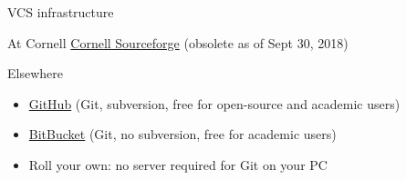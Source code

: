 \documentclass[xcolor=table,compress]{beamer}
\begin{document}
%
%
%


\begin{frame}{VCS infrastructure}
\begin{block}{At Cornell}
\href{https://forge.cornell.edu/sf/sfmain/do/home}{Cornell Sourceforge} (obsolete as of Sept 30, 2018)
\end{block}
\begin{block}{Elsewhere}
\begin{itemize}
\item \href{https://github.com/plans}{GitHub} (Git, subversion, free for open-source and academic users)
\item \href{http://bitbucket.org/}{BitBucket} (Git, no subversion, free for academic users)
\item Roll your own: no server required for Git on your PC
\end{itemize}
\end{block}
\end{frame}
\end{document}
